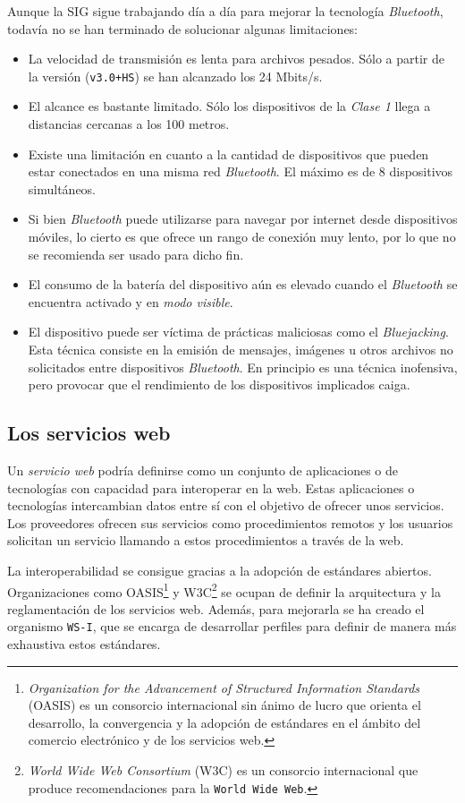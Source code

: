Aunque la \acs{SIG} sigue trabajando día a día para mejorar la tecnología
\emph{Bluetooth}, todavía no se han terminado de solucionar algunas
limitaciones:
\begin{itemize}
\item La velocidad de transmisión es lenta para archivos pesados. Sólo a
partir de la versión (\texttt{v3.0+HS}) se han alcanzado los 24 Mbits/s.
\item El alcance es bastante limitado. Sólo los dispositivos de la
\emph{Clase 1} llega a distancias cercanas a los 100 metros.
\item Existe una limitación en cuanto a la cantidad de dispositivos que pueden
estar conectados en una misma red \emph{Bluetooth}. El máximo es de 8
dispositivos simultáneos.
\item Si bien \emph{Bluetooth} puede utilizarse para navegar por internet desde
dispositivos móviles, lo cierto es que ofrece un rango de conexión muy lento,
por lo que no se recomienda ser usado para dicho fin.
\item El consumo de la batería del dispositivo aún es elevado cuando el
\emph{Bluetooth} se encuentra activado y en \emph{modo visible}.
\item El dispositivo puede ser víctima de prácticas maliciosas como el
\emph{Bluejacking}. Esta técnica consiste en la emisión de mensajes, imágenes
u otros archivos no solicitados entre dispositivos \emph{Bluetooth}. En
principio es una técnica inofensiva, pero provocar que el rendimiento de los
dispositivos implicados caiga.
\end{itemize}


  \subsection{Los servicios web}

Un \emph{servicio web} podría definirse como un conjunto de aplicaciones o de 
tecnologías con capacidad para interoperar en la web. Estas aplicaciones o
tecnologías intercambian datos entre sí con el objetivo de ofrecer unos
servicios. Los proveedores ofrecen sus servicios como procedimientos remotos
y los usuarios solicitan un servicio llamando a estos procedimientos a través
de la web.

La interoperabilidad se consigue gracias a la adopción de estándares abiertos.
Organizaciones como \acs{OASIS}\footnote{\emph{Organization for the Advancement
of Structured Information Standards} (\acs{OASIS}) es un consorcio
internacional sin ánimo de lucro que orienta el desarrollo, la convergencia y
la adopción de estándares en el ámbito del comercio electrónico y de los
servicios web.} y \acs{W3C}\footnote{\emph{World Wide Web Consortium}
(\acs{W3C}) es un consorcio internacional que produce recomendaciones para la
\texttt{World Wide Web}.} se ocupan de definir la arquitectura y la
reglamentación de los servicios web. Además, para mejorarla se ha creado el
organismo \texttt{WS-I}, que se encarga de desarrollar perfiles para definir
de manera más exhaustiva estos estándares.

